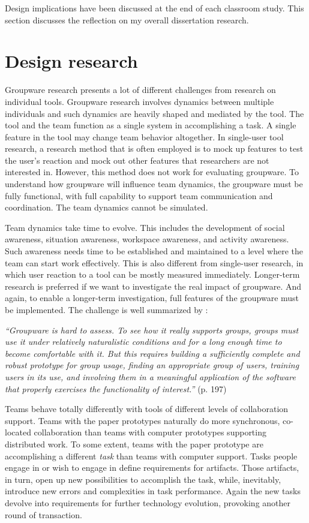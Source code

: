 Design implications have been discussed at the end of each classroom study. This section discusses the reflection on my overall dissertation research.

\section{Design research}

Groupware research presents a lot of different challenges from research on individual tools. Groupware research involves dynamics between multiple individuals and such dynamics are heavily shaped and mediated by the tool. The tool and the team function as a single system in accomplishing a task. A single feature in the tool may change team behavior altogether. In single-user tool research, a research method that is often employed is to mock up features to test the user's reaction and mock out other features that researchers are not interested in. However, this method does not work for evaluating groupware. To understand how groupware will influence team dynamics, the groupware must be fully functional, with full capability to support team communication and coordination. The team dynamics cannot be simulated. 

Team dynamics take time to evolve. This includes the development of social awareness, situation awareness, workspace awareness, and activity awareness. Such awareness needs time to be established and maintained to a level where the team can start work effectively. This is also different from single-user research, in which user reaction to a tool can be mostly measured immediately. Longer-term research is preferred if we want to investigate the real impact of groupware. And again, to enable a longer-term investigation, full features of the groupware must be implemented. The challenge is well summarized by \cite{Stahl2006}:

\textit{``Groupware is hard to assess. To see how it really supports groups, groups must use it under relatively naturalistic conditions and for a long enough time to become comfortable with it. But this requires building a sufficiently complete and robust prototype for group usage, finding an appropriate group of users, training users in its use, and involving them in a meaningful application of the software that properly exercises the functionality of interest.''}  (p. 197)

Teams behave totally differently with tools of different levels of collaboration support. Teams with the paper prototypes naturally do more synchronous, co-located collaboration than teams with computer prototypes supporting distributed work. To some extent, teams with the paper prototype are accomplishing a different \emph{task} than teams with computer support. 
Tasks people engage in or wish to engage in define requirements for artifacts. Those artifacts, in turn, open up new possibilities to accomplish the task, while, inevitably, introduce new errors and complexities in task performance. Again the new tasks devolve into requirements for further technology evolution, provoking another round of transaction. 

